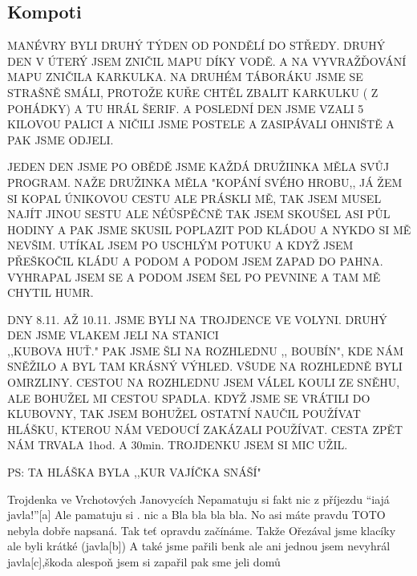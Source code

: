 \subsection*{Kompoti} %
\label{sub:kompoti}


\begin{multicols}{2}


MANÉVRY BYLI DRUHÝ TÝDEN OD PONDĚLÍ DO STŘEDY. DRUHÝ DEN V ÚTERÝ JSEM ZNIČIL MAPU DÍKY VODĚ. A NA VYVRAŽĎOVÁNÍ MAPU ZNIČILA KARKULKA. NA DRUHÉM TÁBORÁKU JSME SE STRAŠNĚ SMÁLI, PROTOŽE KUŘE CHTĚL ZBALIT KARKULKU ( Z POHÁDKY) A TU HRÁL ŠERIF. A POSLEDNÍ DEN JSME VZALI 5 KILOVOU PALICI A NIČILI JSME POSTELE A ZASIPÁVALI OHNIŠTĚ A PAK JSME ODJELI.




JEDEN DEN JSME PO OBĚDĚ JSME KAŽDÁ DRUŽIINKA MĚLA SVŮJ PROGRAM. NAŽE DRUŽINKA MĚLA "KOPÁNÍ SVÉHO HROBU,,
JÁ ŽEM SI KOPAL ÚNIKOVOU CESTU ALE PRÁSKLI MĚ, TAK JSEM MUSEL NAJÍT JINOU SESTU ALE NÉŮSPĚČNĚ TAK JSEM SKOUŠEL ASI PŮL HODINY A PAK JSME SKUSIL POPLAZIT POD KLÁDOU A NYKDO SI MĚ NEVŠIM. UTÍKAL JSEM PO USCHLÝM POTUKU A KDYŽ JSEM PŘEŠKOČIL KLÁDU A PODOM A PODOM JSEM ZAPAD DO PAHNA. VYHRAPAL JSEM SE A PODOM JSEM ŠEL PO PEVNINE A TAM MĚ CHYTIL HUMR.




DNY 8.11. AŽ 10.11. JSME BYLI NA TROJDENCE VE VOLYNI. DRUHÝ DEN JSME VLAKEM JELI NA STANICI \\,,KUBOVA HUŤ." PAK JSME ŠLI NA ROZHLEDNU ,, BOUBÍN", KDE NÁM SNĚŽILO A BYL TAM KRÁSNÝ VÝHLED. VŠUDE NA ROZHLEDNĚ BYLI OMRZLINY. CESTOU NA ROZHLEDNU JSEM VÁLEL KOULI ZE SNĚHU, ALE BOHUŽEL MI CESTOU SPADLA. KDYŽ JSME SE VRÁTILI DO KLUBOVNY, TAK JSEM BOHUŽEL OSTATNÍ NAUČIL POUŽÍVAT HLÁŠKU, KTEROU NÁM VEDOUCÍ ZAKÁZALI POUŽÍVAT. CESTA ZPĚT NÁM TRVALA 1hod. A 30min. TROJDENKU JSEM SI MIC UŽIL.


PS: TA HLÁŠKA BYLA ,,KUR VAJÍČKA SNÁŠÍ"





Trojdenka ve Vrchotových Janovycích
Nepamatuju si fakt nic z příjezdu “iajá javla!”[a] 
Ale pamatuju si . nic a Bla bla bla bla. No asi máte pravdu TOTO nebyla dobře napsaná. Tak teť opravdu začínáme. Takže Ořezával jsme klacíky ale byli krátké (javla[b]) A také jsme pařili benk ale ani jednou jsem nevyhrál javla[c],škoda alespoň jsem si zapařil pak sme jeli domů




\columnbreak


\end{multicols}
